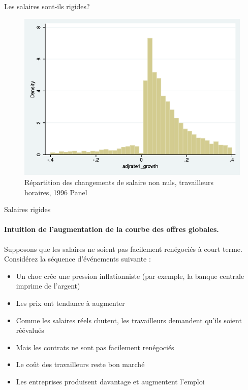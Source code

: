 \documentclass[
  ignorenonframetext,
  aspectratio=169,
]{beamer}
\providecommand{\tightlist}{%
  \setlength{\itemsep}{0pt}\setlength{\parskip}{0pt}}\usepackage{longtable,booktabs,array}
\begin{document}
\begin{frame}{Les salaires sont-ils rigides?}
\label{les-salaires-sont-ils-rigides}
\begin{figure}[H]

{\centering \includegraphics[width=\textwidth,height=0.8\textheight]{assets/sticky_wages.png}

}

\caption{Répartition des changements de salaire non nuls, travailleurs
horaires, 1996 Panel}

\end{figure}%
\end{frame}

\begin{frame}{Salaires rigides}
\label{salaires-rigides-2}
\framesubtitle{Intuition de l'augmentation de la courbe des offres globales.}

Supposons que les salaires ne soient pas facilement renégociés à court
terme. Considérez la séquence d'événements suivante :

\begin{itemize}
\tightlist
\item
  Un choc crée une pression inflationniste (par exemple, la banque
  centrale imprime de l'argent)
\item
  Les prix ont tendance à augmenter
\item
  Comme les salaires réels chutent, les travailleurs demandent qu'ils
  soient réévalués
\item
  Mais les contrats ne sont pas facilement renégociés
\item
  Le coût des travailleurs reste bon marché
\item
  Les entreprises produisent davantage et augmentent l'emploi
\end{itemize}
\end{frame}
\end{document}

